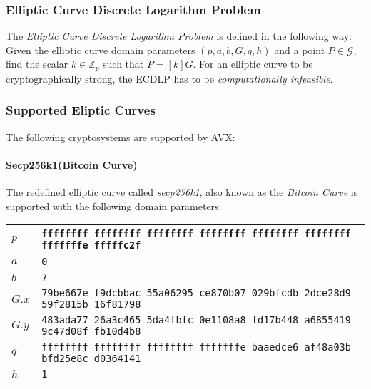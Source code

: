 \subsubsection{Elliptic Curve Discrete Logarithm Problem}
The \textit{Elliptic Curve Discrete Logarithm Problem} is defined in \cite{Trappe05} the following way: Given the elliptic curve domain parameters \( (p, a, b, G, q, h) \) and a point \( P \in \mathcal{G} \), find the scalar \( k \in \mathbb{Z}_p \) such that \( P = [k]G \). For an elliptic curve to be cryptographically strong, the ECDLP has to be \textit{computationally infeasible}.

\subsubsection{Supported Eliptic Curves}
The following cryptosystems are supported by AVX:

\paragraph{Secp256k1(Bitcoin Curve)}

The redefined elliptic curve called \textit{secp256k1}, also known as the \textit{Bitcoin Curve} is supported with the following domain parameters:
\begin{center}
\begin{tabular}{ | l | l | }
    \hline
    $p$ & \footnotesize \texttt{ffffffff ffffffff ffffffff ffffffff ffffffff ffffffff fffffffe fffffc2f} \\ \hline
    $a$ & \footnotesize \texttt{0} \\ \hline
    $b$ & \footnotesize \texttt{7} \\ \hline
    $G.x$ & \footnotesize \texttt{79be667e f9dcbbac 55a06295 ce870b07 029bfcdb 2dce28d9 59f2815b 16f81798} \\ \hline
    $G.y$ & \footnotesize \texttt{483ada77 26a3c465 5da4fbfc 0e1108a8 fd17b448 a6855419 9c47d08f fb10d4b8} \\ \hline
    $q$ & \footnotesize \texttt{ffffffff ffffffff ffffffff fffffffe baaedce6 af48a03b bfd25e8c d0364141} \\ \hline
    $h$ & \footnotesize \texttt{1} \\ \hline
\end{tabular}
\end{center}

